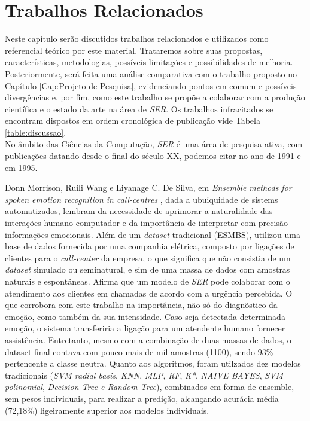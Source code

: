 \chapter{Trabalhos Relacionados}\label{Cap:Trabalhos Relacionados}

Neste capítulo serão discutidos trabalhos relacionados e utilizados como referencial teórico por este material. Trataremos sobre suas propostas, características, metodologias, possíveis limitações e possibilidades de melhoria. Posteriormente, será feita uma análise comparativa com o trabalho proposto no Capítulo \ref{Cap:Projeto de Pesquisa}, evidenciando pontos em comum e possíveis divergências e, por fim, como este trabalho se propõe a colaborar com a produção científica e o estado da arte na área de \textit{SER}. Os trabalhos infracitados se encontram dispostos em ordem cronológica de publicação vide Tabela \ref{table:discussao}.\\


No âmbito das Ciências da Computação, \textit{SER} é uma área de pesquisa ativa, com publicações datando desde o final do século XX, podemos citar \cite{12.27} no ano de 1991 e \cite{12.28} em 1995.


Donn Morrison, Ruili Wang e Liyanage C. De Silva, em \textit{Ensemble methods for spoken emotion recognition in call-centres} \cite{32.32}, dada a ubuiquidade de sistems automatizados, lembram da necessidade de aprimorar a naturalidade das interações humano-computador e da importância de interpretar com precisão informações emocionais. Além de um \textit{dataset} tradicional (ESMBS), utilizou uma base de dados fornecida por uma companhia elétrica, composto por ligações de clientes para o \textit{call-center} da empresa, o que significa que não consistia de um \textit{dataset} simulado ou seminatural, e sim de uma massa de dados com amostras naturais e espontâneas. Afirma que um modelo de \textit{SER} pode colaborar com o atendimento aos clientes em chamadas de acordo com a urgência percebida. O que corrobora com este trabalho na importância, não só do diagnõstico da emoção, como também da sua intensidade. Caso seja detectada determinada emoção, o sistema transferiria a ligação para um atendente humano fornecer assistência. Entretanto, mesmo com a combinação de duas massas de dados, o dataset final contava com pouco mais de mil amostras (1100), sendo 93\% pertencente a classe neutra. Quanto aos algoritmos, foram utilzados dez modelos tradicionais (\textit{SVM radial basis}, \textit{KNN}, \textit{MLP}, \textit{RF}, \textit{K*}, \textit{NAIVE BAYES}, \textit{SVM polinomial}, \textit{Decision Tree e Random Tree}), combinados em forma de ensemble, sem pesos individuais, para realizar a predição, alcançando acurácia média (72,18\%) ligeiramente superior aos modelos individuais.


